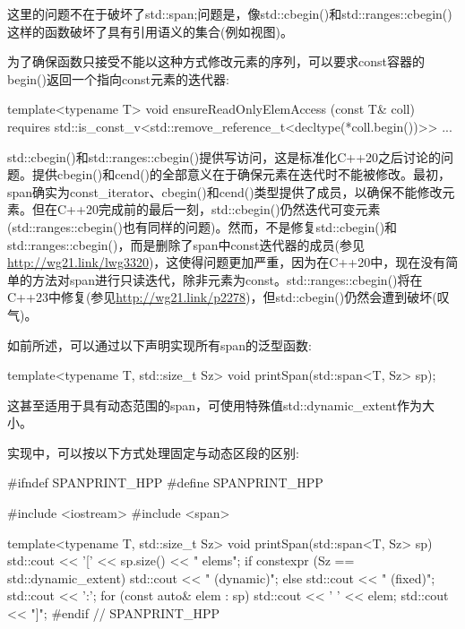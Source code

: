 这里的问题不在于破坏了std::span;问题是，像std::cbegin()和std::ranges::cbegin()这样的函数破坏了具有引用语义的集合(例如视图)。

为了确保函数只接受不能以这种方式修改元素的序列，可以要求const容器的begin()返回一个指向const元素的迭代器:

\begin{cpp}
template<typename T>
void ensureReadOnlyElemAccess (const T& coll)
requires std::is_const_v<std::remove_reference_t<decltype(*coll.begin())>>
{
	...
}
\end{cpp}

std::cbegin()和std::ranges::cbegin()提供写访问，这是标准化C++20之后讨论的问题。提供cbegin()和cend()的全部意义在于确保元素在迭代时不能被修改。最初，span确实为const\_iterator、cbegin()和cend()类型提供了成员，以确保不能修改元素。但在C++20完成前的最后一刻，std::cbegin()仍然迭代可变元素(std::ranges::cbegin()也有同样的问题)。然而，不是修复std::cbegin()和std::ranges::cbegin()，而是删除了span中const迭代器的成员(参见\url{http://wg21.link/lwg3320})，这使得问题更加严重，因为在C++20中，现在没有简单的方法对span进行只读迭代，除非元素为const。std::ranges::cbegin()将在C++23中修复(参见\url{http://wg21.link/p2278})，但std::cbegin()仍然会遭到破坏(叹气)。


如前所述，可以通过以下声明实现所有span的泛型函数:

\begin{cpp}
template<typename T, std::size_t Sz>
void printSpan(std::span<T, Sz> sp);
\end{cpp}

这甚至适用于具有动态范围的span，可使用特殊值std::dynamic\_extent作为大小。

实现中，可以按以下方式处理固定与动态区段的区别:


\begin{cpp}
#ifndef SPANPRINT_HPP
#define SPANPRINT_HPP

#include <iostream>
#include <span>

template<typename T, std::size_t Sz>
void printSpan(std::span<T, Sz> sp)
{
	std::cout << '[' << sp.size() << " elems";
	if constexpr (Sz == std::dynamic_extent) {
		std::cout << " (dynamic)";
	}
	else {
		std::cout << " (fixed)";
	}
	std::cout << ':';
	for (const auto& elem : sp) {
		std::cout << ' ' << elem;
	}
	std::cout << "]\n";
	}
#endif // SPANPRINT_HPP
\end{cpp}


